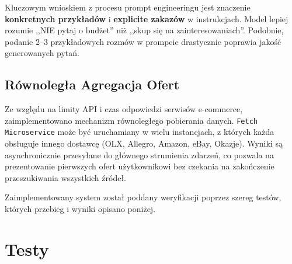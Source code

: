 \documentclass[12pt,a4paper]{article}
\begin{document}
Kluczowym wnioskiem z procesu prompt engineeringu jest znaczenie \textbf{konkretnych przykładów} i \textbf{explicite zakazów} w instrukcjach. Model lepiej rozumie ,,NIE pytaj o budżet'' niż ,,skup się na zainteresowaniach''. Podobnie, podanie 2--3 przykładowych rozmów w prompcie drastycznie poprawia jakość generowanych pytań.

\subsection{Równoległa Agregacja Ofert}
Ze względu na limity API i czas odpowiedzi serwisów e-commerce, zaimplementowano mechanizm równoległego pobierania danych. \texttt{Fetch Microservice} może być uruchamiany w wielu instancjach, z których każda obsługuje innego dostawcę (OLX, Allegro, Amazon, eBay, Okazje). Wyniki są asynchronicznie przesyłane do głównego strumienia zdarzeń, co pozwala na prezentowanie pierwszych ofert użytkownikowi bez czekania na zakończenie przeszukiwania wszystkich źródeł.

Zaimplementowany system został poddany weryfikacji poprzez szereg testów, których przebieg i wyniki opisano poniżej.

\section{Testy}
\end{document}
